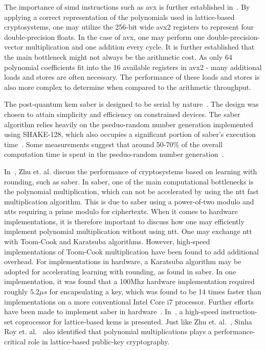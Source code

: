 The importance of \gls{simd} instructions such as \gls{avx} is further established in~\cite{guneysu2013}. By applying a correct representation of the polynomials used in lattice-based cryptosystems, one may utilize the 256-bit wide \gls{avx2} registers to represent four double-precision floats. In the case of \gls{avx}, one may perform one double-precision-vector multiplication and one addition every cycle. It is further established that the main bottleneck might not always be the arithmetic cost. As only 64 polynomial coefficients fit into the 16 available registers in \gls{avx2} - many additional loads and stores are often necessary. The performance of these loads and stores is also more complex to determine when compared to the arithmetic throughput.

The \gls{post-quantum} \gls{kem} \gls{saber} is designed to be serial by nature~\cite{sinha2019}. The design was chosen to attain simplicity and efficiency on constrained devices. The \gls{saber} algorithm relies heavily on the pseduo-random number generation implemented using SHAKE-128, which also occupies a significant portion of \gls{saber}'s execution time~\cite{sinha2019}. Some measurements suggest that around 50-70\% of the overall computation time is spent in the pseduo-random number generation~\cite{saber}.

In~\cite{zhu2021}, Zhu et. al. discuss the performance of cryptosystems based on learning with rounding, such as \gls{saber}. In \gls{saber}, one of the main computational bottlenecks is the polynomial multiplication, which can not be accelerated by using the \gls{ntt} fast multiplication algorithm. This is due to \gls{saber} using a power-of-two modulo and \glspl{ntt} requiring a prime modulo for ciphertexts. When it comes to hardware implementations, it is therefore important to discuss how one may efficiently implement polynomial multiplication without using \gls{ntt}. One may exchange \gls{ntt} with Toom-Cook and Karatsuba algorithms. However, high-speed implementations of Toom-Cook multiplication have been found to add additional overhead. For implementations in hardware, a Karatsuba algorithm may be adopted for accelerating learning with rounding, as found in \gls{saber}. In one implementation, it was found that a 100Mhz hardware implementation required roughly $5.2\mu s$ for encapsulating a key, which was found to be 14 times faster than implementations on a more conventional Intel Core i7 processor. Further efforts have been made to implement \gls{saber} in hardware~\cite{roy2020}. In~\cite{roy2020}, a high-speed instruction-set coprocessor for lattice-based \glspl{kem} is presented. Just like Zhu et. al.~\cite{zhu2021}, Sinha Roy et. al.~\cite{roy2020} also identified that polynomial multiplications plays a performance-critical role in lattice-based public-key cryptography.

